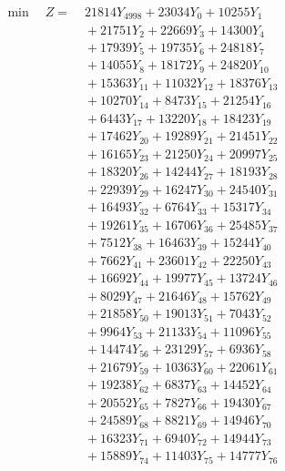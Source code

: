 \documentclass[a4paper,10pt]{article}
\begin{document}
\allowdisplaybreaks
{\small
\begin{align}
\min \quad Z = &\; 21814 Y_{4998} + 23034 Y_{0} + 10255 Y_{1} \\[0.3ex]
&\;  + 21751 Y_{2} + 22669 Y_{3} + 14300 Y_{4} \\[0.3ex]
&\;  + 17939 Y_{5} + 19735 Y_{6} + 24818 Y_{7} \\[0.3ex]
&\;  + 14055 Y_{8} + 18172 Y_{9} + 24820 Y_{10} \\[0.3ex]
&\;  + 15363 Y_{11} + 11032 Y_{12} + 18376 Y_{13} \\[0.3ex]
&\;  + 10270 Y_{14} + 8473 Y_{15} + 21254 Y_{16} \\[0.3ex]
&\;  + 6443 Y_{17} + 13220 Y_{18} + 18423 Y_{19} \\[0.3ex]
&\;  + 17462 Y_{20} + 19289 Y_{21} + 21451 Y_{22} \\[0.3ex]
&\;  + 16165 Y_{23} + 21250 Y_{24} + 20997 Y_{25} \\[0.3ex]
&\;  + 18320 Y_{26} + 14244 Y_{27} + 18193 Y_{28} \\[0.5ex]\allowbreak
&\;  + 22939 Y_{29} + 16247 Y_{30} + 24540 Y_{31} \\[0.3ex]
&\;  + 16493 Y_{32} + 6764 Y_{33} + 15317 Y_{34} \\[0.3ex]
&\;  + 19261 Y_{35} + 16706 Y_{36} + 25485 Y_{37} \\[0.3ex]
&\;  + 7512 Y_{38} + 16463 Y_{39} + 15244 Y_{40} \\[0.3ex]
&\;  + 7662 Y_{41} + 23601 Y_{42} + 22250 Y_{43} \\[0.3ex]
&\;  + 16692 Y_{44} + 19977 Y_{45} + 13724 Y_{46} \\[0.3ex]
&\;  + 8029 Y_{47} + 21646 Y_{48} + 15762 Y_{49} \\[0.3ex]
&\;  + 21858 Y_{50} + 19013 Y_{51} + 7043 Y_{52} \\[0.3ex]
&\;  + 9964 Y_{53} + 21133 Y_{54} + 11096 Y_{55} \\[0.3ex]
&\;  + 14474 Y_{56} + 23129 Y_{57} + 6936 Y_{58} \\[0.5ex]\allowbreak
&\;  + 21679 Y_{59} + 10363 Y_{60} + 22061 Y_{61} \\[0.3ex]
&\;  + 19238 Y_{62} + 6837 Y_{63} + 14452 Y_{64} \\[0.3ex]
&\;  + 20552 Y_{65} + 7827 Y_{66} + 19430 Y_{67} \\[0.3ex]
&\;  + 24589 Y_{68} + 8821 Y_{69} + 14946 Y_{70} \\[0.3ex]
&\;  + 16323 Y_{71} + 6940 Y_{72} + 14944 Y_{73} \\[0.3ex]
&\;  + 15889 Y_{74} + 11403 Y_{75} + 14777 Y_{76} \\[0.3ex]

\end{align}}
\end{document}

